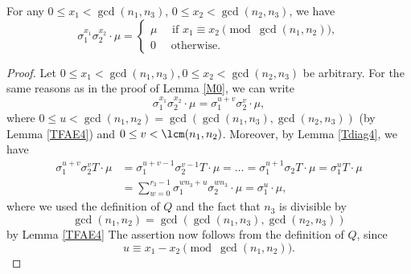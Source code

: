 \begin{lemma}\label{M04}
For any $0\leq x_1<\gcd(n_1,n_3)$, $ 0\leq x_2<\gcd(n_2,n_3)$, we have $$\sigma_1^{x_1}\sigma_2^{x_2}\cdot \mu=\begin{cases}
\mu \quad \text{ if } x_1\equiv x_2 \pmod{\gcd(n_1,n_2)},\\
0 \quad \text{ otherwise}.
\end{cases}$$
\end{lemma}
\begin{proof}
Let $0\leq x_1<\gcd(n_1,n_3), 0\leq x_2<\gcd(n_2,n_3)$ be arbitrary. For the same reasons as in the proof of Lemma \ref{M0}, we can write $$\sigma_1^{x_1}\sigma_2^{x_2}\cdot \mu=\sigma_1^{u+v}\sigma_2^{v} \cdot \mu,$$
where $0\leq u<\gcd(n_1,n_2)=\gcd(\gcd(n_1,n_3),\gcd(n_2,n_3))$ (by Lemma \ref{TFAE4}) and $0\leq v<\lcm(n_1,n_2)$. Moreover, by Lemma \ref{Tdiag4}, we have
\begin{align*}
\sigma_1^{u+v}\sigma_2^{v}T\cdot \mu&=\sigma_1^{u+v-1}\sigma_2^{v-1}T\cdot \mu=\dots=\sigma_1^{u+1}\sigma_2T\cdot \mu=\sigma_1^{u}T\cdot \mu\\
&=\sum_{w=0}^{r_3-1}\sigma_1^{wn_3+u}\sigma_2^{wn_3}\cdot \mu=\sigma_1^u\cdot \mu,
\end{align*}
where we used the definition of $Q$ and the fact that $n_3$ is divisible by $$\gcd(n_1,n_2)=\gcd(\gcd(n_1,n_3),\gcd(n_2,n_3))$$ by Lemma \ref{TFAE4}
The assertion now follows from the definition of $Q$, since $$u\equiv x_1-x_2 \pmod{\gcd(n_1,n_2)}.$$
\end{proof}

